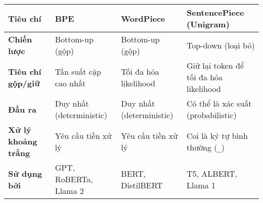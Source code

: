 \begin{tcolorbox}[
    title={Tổng kết các Kỹ thuật Tokenization Hiện đại},
    colback=green!5!white, colframe=green!60!black, fonttitle=\bfseries
]
\begin{tabularx}{\linewidth}{|l|X|X|X|}
    \hline
    \textbf{Tiêu chí} & \textbf{BPE} & \textbf{WordPiece} & \textbf{SentencePiece (Unigram)} \\
    \hline
    \textbf{Chiến lược} & Bottom-up (gộp) & Bottom-up (gộp) & Top-down (loại bỏ) \\
    \hline
    \textbf{Tiêu chí gộp/giữ} & Tần suất cặp cao nhất & Tối đa hóa likelihood & Giữ lại token để tối đa hóa likelihood \\
    \hline
    \textbf{Đầu ra} & Duy nhất (deterministic) & Duy nhất (deterministic) & Có thể là xác suất (probabilistic) \\
    \hline
    \textbf{Xử lý khoảng trắng} & Yêu cầu tiền xử lý & Yêu cầu tiền xử lý & Coi là ký tự bình thường (\texttt{\_}) \\
    \hline
    \textbf{Sử dụng bởi} & GPT, RoBERTa, Llama 2 & BERT, DistilBERT & T5, ALBERT, Llama 1 \\
    \hline
\end{tabularx}
\end{tcolorbox}
